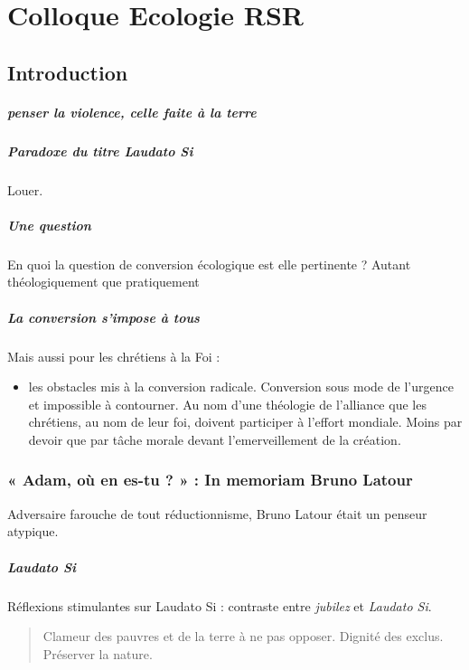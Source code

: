 \chapter{Colloque Ecologie RSR}

\section{Introduction}

\paragraph{penser la violence, celle faite à la terre}


\paragraph{Paradoxe du titre Laudato Si} Louer.

\paragraph{Une question } En quoi la question de conversion écologique est elle pertinente ? Autant théologiquement que pratiquement

\paragraph{La conversion s'impose à tous} Mais aussi pour les chrétiens à la Foi : 
\begin{itemize}
    \item les obstacles mis à la conversion radicale. 
    Conversion sous mode de l'urgence et impossible à contourner.
    Au nom d'une théologie de l'alliance que les chrétiens, au nom de leur foi, doivent participer à l'effort mondiale.
    Moins par devoir que par tâche morale devant l'emerveillement de la création.
\end{itemize}


 \subsection{« Adam, où en es-tu ? » : In memoriam Bruno Latour}

Adversaire farouche de tout réductionnisme, Bruno Latour était un penseur atypique. 
\paragraph{Laudato Si}
Réflexions stimulantes sur Laudato Si : contraste entre \textit{jubilez} et \textit{Laudato Si}. 
\begin{quote}
    Clameur des pauvres et de la terre à ne pas opposer. Dignité des exclus. Préserver la nature.
\end{quote}

